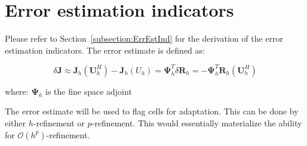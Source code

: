 \section{Error estimation indicators}

Please refer to Section~\ref{subsection:ErrEstInd} for the derivation of the error estimation indicators. The error estimate is defined as:\par

\begin{equation}
\delta \mathbf{J} \approx  \mathbf{J}_h(\mathbf{U}_h^H) - \mathbf{J}_h(U_h) = \mathbf{\Psi}_h^T \delta \mathbf{R}_h = -\mathbf{\Psi}_h^T \mathbf{R}_h(\mathbf{U}_h^H)
\end{equation}

where: $\mathbf{\Psi}_h$ is the fine space adjoint

The error estimate will be used to flag cells for adaptation. This can be done by either $h$-refinement or $p$-refinement. This would essentially materialize the ability for $\mathcal{O}(h^p)$-refinement.